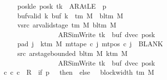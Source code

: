 \begin{isabellebody}
\ \ \ \ \ \ \ poskle{\isacharcolon}{\kern0pt}\ {\isachardoublequoteopen}posk\ tk\ {\isacharequal}{\kern0pt}\ AR{\isacharunderscore}{\kern0pt}AtLE\ {\isasymlongleftrightarrow}\ p\ {\isacharequal}{\kern0pt}\ {}{\isachardoublequoteclose}\isanewline
\ \ \ \ \ \ \ buf{\isacharunderscore}{\kern0pt}valid{\isacharcolon}{\kern0pt}\ {\isachardoublequoteopen}{\isasymforall}k{\isachardot}{\kern0pt}\ buf\ k\ {\isasymin}\ {\isasymGamma}{\isacharunderscore}{\kern0pt}tm\ M\ {\isasymunion}\ {\isacharbraceleft}{\kern0pt}bl{\isacharunderscore}{\kern0pt}tm\ M{\isacharbraceright}{\kern0pt}{\isachardoublequoteclose}\isanewline
\ \ \ \ \ \ \ vsrc{\isacharcolon}{\kern0pt}\ {\isachardoublequoteopen}ar{\isacharunderscore}{\kern0pt}valid{\isacharunderscore}{\kern0pt}stage\ {\isacharparenleft}{\kern0pt}{\isasymGamma}{\isacharunderscore}{\kern0pt}tm\ M{\isacharparenright}{\kern0pt}\ {\isacharparenleft}{\kern0pt}bl{\isacharunderscore}{\kern0pt}tm\ M{\isacharparenright}{\kern0pt}\isanewline
\ \ \ \ \ \ \ \ \ \ \ \ \ \ \ \ \ \ \ {\isacharparenleft}{\kern0pt}AR{\isacharunderscore}{\kern0pt}SimWrite{\isacharcomma}{\kern0pt}\ tk{\isacharcomma}{\kern0pt}\ {}{\isacharcomma}{\kern0pt}\ buf{\isacharcomma}{\kern0pt}\ dvec{\isacharcomma}{\kern0pt}\ posk{\isacharparenright}{\kern0pt}{\isachardoublequoteclose}\isanewline
\ \ \ \ \ \ \ pad{}{\isacharcolon}{\kern0pt}\ {\isachardoublequoteopen}{\isasymforall}j\ {\isasymge}\ k{\isacharunderscore}{\kern0pt}tm\ M{\isachardot}{\kern0pt}\ mt{\isacharunderscore}{\kern0pt}tape\ c{\isacharprime}{\kern0pt}\ j\ {\isacharparenleft}{\kern0pt}mt{\isacharunderscore}{\kern0pt}pos\ c{\isacharprime}{\kern0pt}\ j{\isacharparenright}{\kern0pt}\ {\isacharequal}{\kern0pt}\ BLANK{}{\isachardoublequoteclose}\isanewline
\ \ \ \ \ \ \ src{}{\isacharcolon}{\kern0pt}\ {\isachardoublequoteopen}ar{\isacharunderscore}{\kern0pt}stage{\isacharunderscore}{\kern0pt}bounded\ {\isacharparenleft}{\kern0pt}bl{\isacharunderscore}{\kern0pt}tm\ M{\isacharparenright}{\kern0pt}\ {\isacharparenleft}{\kern0pt}k{\isacharunderscore}{\kern0pt}tm\ M{\isacharparenright}{\kern0pt}\isanewline
\ \ \ \ \ \ \ \ \ \ \ \ \ \ \ \ \ \ \ {\isacharparenleft}{\kern0pt}AR{\isacharunderscore}{\kern0pt}SimWrite{\isacharcomma}{\kern0pt}\ tk{\isacharcomma}{\kern0pt}\ {}{\isacharcomma}{\kern0pt}\ buf{\isacharcomma}{\kern0pt}\ dvec{\isacharcomma}{\kern0pt}\ posk{\isacharparenright}{\kern0pt}{\isachardoublequoteclose}\isanewline
\ \ \ {\isachardoublequoteopen}{\isasymexists}c{\isacharprime}{\kern0pt}{\isacharprime}{\kern0pt}{\isachardot}{\kern0pt}\ {\isacharparenleft}{\kern0pt}c{\isacharprime}{\kern0pt}{\isacharcomma}{\kern0pt}\ c{\isacharprime}{\kern0pt}{\isacharprime}{\kern0pt}{\isacharparenright}{\kern0pt}\ {\isasymin}\ R{\isacharprime}{\kern0pt}\ {\isacharcircum}{\kern0pt}{\isacharcircum}{\kern0pt}\ {\isacharparenleft}{\kern0pt}if\ p\ {\isacharequal}{\kern0pt}\ {}\ then\ {}\ else\ {}\ {\isacharasterisk}{\kern0pt}\ block{\isacharunderscore}{\kern0pt}width\ {\isacharparenleft}{\kern0pt}{\isasymGamma}{\isacharunderscore}{\kern0pt}tm\ M{\isacharparenright}{\kern0pt}{\isacharparenright}{\kern0pt}\isanewline

\end{isabellebody}
